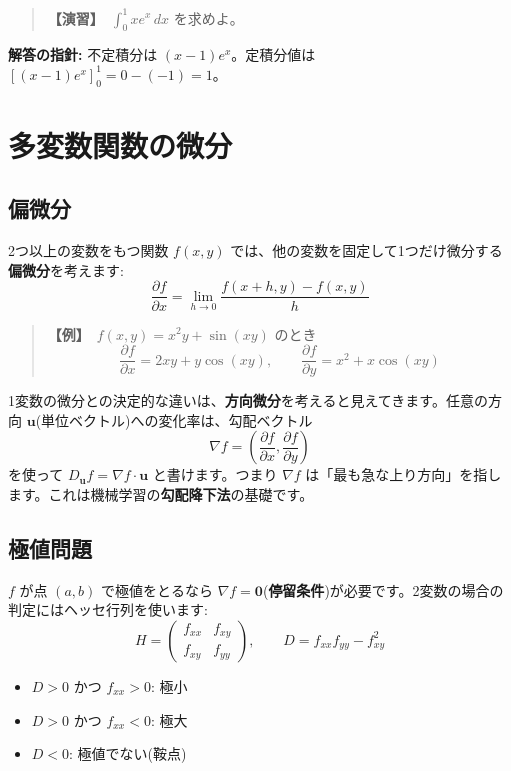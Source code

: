 \documentclass{article}
\begin{document}
\begin{quote}
\textbf{【演習】}\ \(\int_0^1 x e^x\, dx\) を求めよ。
\end{quote}

\textbf{解答の指針:} 不定積分は \((x-1)e^x\)。定積分値は \([ (x-1)e^x ]_0^1 = 0 - (-1) = 1\)。

\section{多変数関数の微分}

\subsection{偏微分}

2つ以上の変数をもつ関数 \(f(x, y)\) では、他の変数を固定して1つだけ微分する\textbf{偏微分}を考えます:
\[ \frac{\partial f}{\partial x} = \lim_{h \to 0} \frac{f(x+h, y) - f(x, y)}{h} \]

\begin{quote}
\textbf{【例】}\ \(f(x, y) = x^2 y + \sin(xy)\) のとき
\[ \frac{\partial f}{\partial x} = 2xy + y \cos(xy), \qquad \frac{\partial f}{\partial y} = x^2 + x \cos(xy) \]
\end{quote}

1変数の微分との決定的な違いは、\textbf{方向微分}を考えると見えてきます。任意の方向 \(\boldsymbol{u}\)(単位ベクトル)への変化率は、勾配ベクトル
\[ \nabla f = \left( \frac{\partial f}{\partial x}, \frac{\partial f}{\partial y} \right) \]
を使って \(D_{\boldsymbol{u}} f = \nabla f \cdot \boldsymbol{u}\) と書けます。つまり \(\nabla f\) は「最も急な上り方向」を指します。これは機械学習の\textbf{勾配降下法}の基礎です。

\subsection{極値問題}

\(f\) が点 \((a, b)\) で極値をとるなら \(\nabla f = \boldsymbol{0}\)(\textbf{停留条件})が必要です。2変数の場合の判定にはヘッセ行列を使います:
\[ H = \begin{pmatrix} f_{xx} & f_{xy} \\ f_{xy} & f_{yy} \end{pmatrix}, \qquad D = f_{xx} f_{yy} - f_{xy}^2 \]
\begin{itemize}
\item \(D > 0\) かつ \(f_{xx} > 0\): 極小
\item \(D > 0\) かつ \(f_{xx} < 0\): 極大
\item \(D < 0\): 極値でない(鞍点)
\end{itemize}
\end{document}
